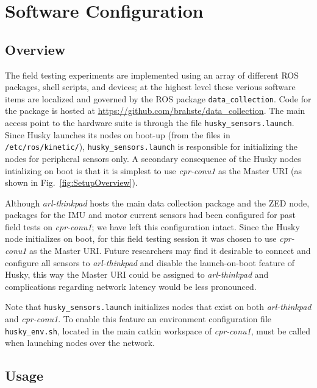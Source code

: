 \documentclass[
	12pt, %
]{fphw}
\newcommand{\code}[1]{\colorbox{light-gray}{\texttt{#1}}}
\begin{document}

\section{Software Configuration}
\label{sec:SoftwareConfiguration}

\subsection{Overview}

The field testing experiments are implemented using an array of different ROS packages, shell scripts, and devices; at the highest level these verious software items are localized and governed by the ROS package \code{data\_collection}. Code for the package is hosted at \url{https://github.com/brahste/data_collection}. The main access point to the hardware suite is through the file \code{husky\_sensors.launch}. Since Husky launches its nodes on boot-up (from the files in \code{/etc/ros/kinetic/}), \code{husky\_sensors.launch} is responsible for initializing the nodes for peripheral sensors only. A secondary consequence of the Husky nodes intializing on boot is that it is simplest to use \emph{cpr-conu1} as the Master URI (as shown in Fig.~\ref{fig:SetupOverview}). 

Although \emph{arl-thinkpad} hosts the main data collection package and the ZED node, packages for the IMU and motor current sensors had been configured for past field tests on \emph{cpr-conu1}; we have left this configuration intact. Since the Husky node initializes on boot, for this field testing session it was chosen to use \emph{cpr-conu1} as the Master URI. Future researchers may find it desirable to connect and configure all sensors to \textit{arl-thinkpad} and disable the launch-on-boot feature of Husky, this way the Master URI could be assigned to \textit{arl-thinkpad} and complications regarding network latency would be less pronounced.

Note that \code{husky\_sensors.launch} initializes nodes that exist on both \emph{arl-thinkpad} and \emph{cpr-conu1}. To enable this feature an environment configuration file \code{husky\_env.sh}, located in the main catkin workspace of \emph{cpr-conu1}, must be called when launching nodes over the network. 

\subsection{Usage}
\end{document}
